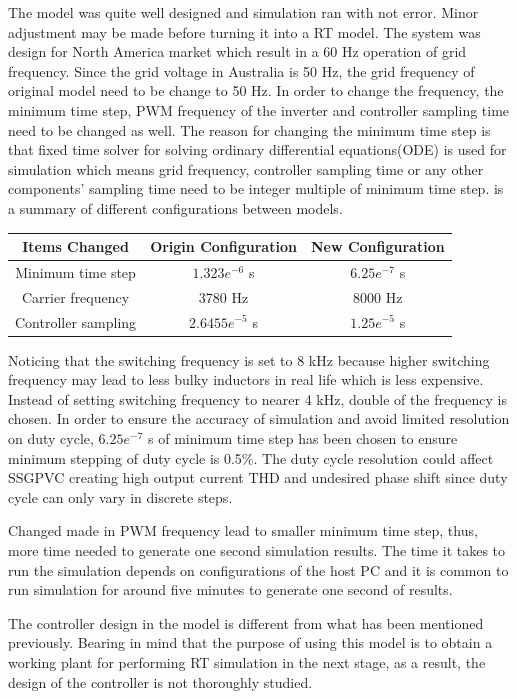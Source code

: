 The model was quite well designed and simulation ran with not error. Minor adjustment may be made before turning it into a \gls{RT} model. The system was design for North America market which result in a 60 Hz operation of grid frequency. Since the grid voltage in Australia is 50 Hz, the grid frequency of original model need to be change to 50 Hz. In order to change the frequency, the minimum time step, \gls{PWM} frequency of the inverter and controller sampling time need to be changed as well. The reason for changing the minimum time step is that fixed time solver for solving ordinary differential equations(ODE) is used for simulation which means grid frequency, controller sampling time or any other components' sampling time need to be integer multiple of minimum time step.  is a summary of different configurations between models. 
\begin{center}\label{tab:change_list}
\begin{tabular}{ |c|c|c| } 
 \hline
 Items Changed & Origin Configuration & New Configuration\\ \hline
 Minimum time step &  $1.323e^{-6}$ s & $6.25e^{-7}$ s \\ \hline
 Carrier frequency & 3780 Hz & 8000 Hz\\ \hline
 Controller sampling & $2.6455e^{-5}$ s& $1.25e^{-5}$ s\\ \hline
\end{tabular}
\end{center}

Noticing that the switching frequency is set to 8 kHz because higher switching frequency may lead to less bulky inductors in real life which is less expensive. Instead of setting switching frequency to nearer 4 kHz, double of the frequency is chosen. In order to ensure the accuracy of simulation and avoid limited resolution on duty cycle, $6.25e^{-7}$ s of minimum time step has been chosen to ensure minimum stepping of duty cycle is 0.5\%. The duty cycle resolution could affect \gls{SSGPVC} creating high output current THD and undesired phase shift since duty cycle can only vary in discrete steps.

Changed made in \gls{PWM} frequency lead to smaller minimum time step, thus, more time needed to generate one second simulation results. The time it takes to run the simulation depends on configurations of the host PC and it is common to run simulation for around five minutes to generate one second of results. 

The controller design in the model is different from what has been mentioned previously. Bearing in mind that the purpose of using this model is to obtain a working plant for performing \gls{RT} simulation in the next stage, as a result, the design of the controller is not thoroughly studied. 

